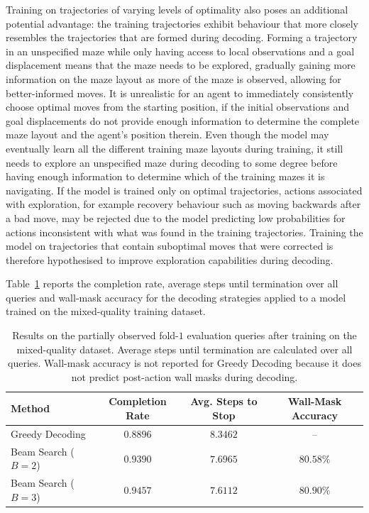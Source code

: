 ﻿\documentclass[12pt,a4paper]{article}
\theoremstyle{definition}
\begin{document}
Training on trajectories of varying levels of optimality also poses an additional potential advantage:
the training trajectories exhibit behaviour that more closely resembles the trajectories that are
formed during decoding. Forming a trajectory in an unspecified maze while only having access to
local observations and a goal displacement means that the maze needs to be explored, gradually gaining more information
on the maze layout as more of the maze is observed, allowing for better-informed moves. It is
unrealistic for an agent to immediately consistently choose optimal moves from the starting position,
if the initial observations and goal displacements do not provide enough information to 
determine the complete maze layout and the agent's position therein. 
Even though the model may eventually learn
all the different training maze layouts during training, it still needs to explore an unspecified maze during
decoding to some degree before having enough information to determine which of the training mazes
it is navigating. If the model is trained only on optimal trajectories, actions associated with
exploration, for example recovery behaviour such as moving backwards after a bad move, may be rejected due
to the model predicting low probabilities for actions inconsistent with what was found
in the training trajectories. Training the model on trajectories that contain suboptimal moves
that were corrected is therefore hypothesised to improve exploration capabilities during decoding.

Table~\ref{tab:partial_mixed_quality_results} reports the completion rate, average steps until termination over
all queries and wall-mask accuracy for the decoding strategies applied to a model trained on the mixed-quality
training dataset.

\begin{table}[H]
\centering
\caption{Results on the partially observed fold-$1$ evaluation queries after training on the mixed-quality dataset. Average steps until termination are calculated over all queries. Wall-mask accuracy is not reported for Greedy Decoding because it does not predict post-action wall masks during decoding.}
\label{tab:partial_mixed_quality_results}
\footnotesize
\begin{tabular}{lccc}
\hline
Method & Completion Rate & Avg. Steps to Stop & Wall-Mask Accuracy \\
\hline
Greedy Decoding & $0.8896$ & $8.3462$ & -- \\
Beam Search ($B=2$) & $0.9390$ & $7.6965$ & $80.58\%$ \\
Beam Search ($B=3$) & $0.9457$ & $7.6112$ & $80.90\%$ \\
\hline
\end{tabular}
\end{table}
\end{document}
